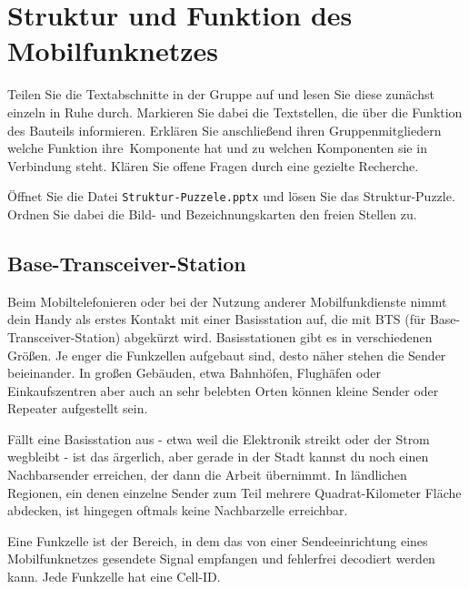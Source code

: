 \documentclass[loesung]{schulein}
\begin{document}
 
%
\section*{Struktur und Funktion des Mobilfunknetzes}
\begin{aufgaben}
\item Teilen Sie die Textabschnitte in der Gruppe auf und lesen Sie diese zunächst einzeln in Ruhe durch. Markieren Sie dabei die Textstellen, die über die Funktion des Bauteils informieren. Erklären Sie  anschließend ihren Gruppenmitgliedern welche Funktion \glqq ihre\grqq\ Komponente hat und zu welchen Komponenten sie in Verbindung steht. Klären Sie offene Fragen durch eine gezielte Recherche.
\item Öffnet Sie die Datei \texttt{Struktur-Puzzele.pptx} und lösen Sie das Struktur-Puzzle. Ordnen Sie dabei die Bild- und Bezeichnungskarten den freien Stellen zu. 

\end{aufgaben}
%
\subsection*{Base-Transceiver-Station}
Beim Mobiltelefonieren oder bei der Nutzung anderer Mobilfunkdienste nimmt dein Handy als erstes Kontakt mit einer Basisstation auf, die mit BTS (für Base-Transceiver-Station) abgekürzt wird. %
Basisstationen gibt es in verschiedenen \glqq Größen\grqq . Je enger die Funkzellen aufgebaut sind, desto näher stehen die Sender beieinander. In großen Gebäuden, etwa Bahnhöfen, Flughäfen oder Einkaufszentren aber auch an sehr belebten Orten können kleine Sender oder Repeater aufgestellt sein.

Fällt eine Basisstation aus - etwa weil die Elektronik streikt oder der Strom wegbleibt - ist das ärgerlich, aber gerade in der Stadt kannst du noch einen Nachbarsender erreichen, der dann die Arbeit übernimmt. In ländlichen Regionen, ein denen einzelne Sender zum Teil mehrere Quadrat-Kilometer Fläche abdecken, ist hingegen oftmals keine Nachbarzelle erreichbar.
 
Eine Funkzelle ist der Bereich, in dem das von einer Sendeeinrichtung eines Mobilfunknetzes gesendete Signal empfangen und fehlerfrei decodiert werden kann. Jede Funkzelle hat eine Cell-ID.
\end{document}
